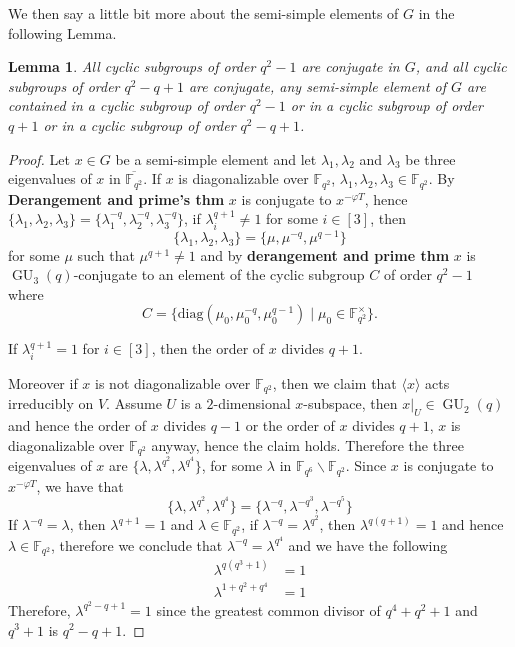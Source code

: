 \documentclass[12pt,reqno]{amsart}
\newcommand{\GU}{\operatorname{GU}}
\newcommand{\FF}{\mathbb{F}}
\newcommand{\lr}{\langle}
\newcommand{\rr}{\rangle}
\theoremstyle{plain}
\newtheorem{lemma}[proposition]{Lemma}
\theoremstyle{definition}
\begin{document}
We then say a little bit more about the semi-simple elements of $G$ in the following Lemma.
\begin{lemma}\label{semisimple}
	All cyclic subgroups of order $q^2-1$ are conjugate in $G$, and all cyclic subgroups of order $q^2-q+1$ are conjugate, any semi-simple element of $G$ are contained in a cyclic subgroup of order $q^2-1$ or in a cyclic subgroup of order $q+1$ or in a cyclic subgroup of order $q^2-q+1$.
\end{lemma}
\begin{proof}
  Let $x\in G$ be a semi-simple element and let $\lambda_1,\lambda_2$ and $\lambda_3$ be three eigenvalues of $x$ in $\overline{\FF_{q^2}}$. 
  If $x$ is diagonalizable over $\FF_{q^2}$, $\lambda_1,\lambda_2,\lambda_3\in \FF_{q^2}$.
  By \textbf{Derangement and prime's thm} $x$ is conjugate to $x^{-\varphi T}$, hence $\{\lambda_1,\lambda_2,\lambda_3\}=\{\lambda_1^{-q},\lambda_2^{-q},\lambda_3^{-q}\}$, if $\lambda_i^{q+1}\neq 1$ for some $i\in[3]$,  then $$\{\lambda_1,\lambda_2,\lambda_3\}=\{\mu, \mu^{-q}, \mu^{q-1} \}$$ for some $\mu $ such that $\mu^{q+1}\neq 1$ and by \textbf{derangement and prime thm} $x$ is $\GU_3(q)$-conjugate to an element of the cyclic subgroup $C$ of order $q^2-1$ where $$C=\{\mathrm{diag}(\mu_0,\mu_0^{-q},\mu_0^{q-1})\mid \mu_0\in \FF_{q^2}^{\times} \}.$$ 
  
  
  If $\lambda_i^{q+1}=1$ for $i \in [3]$, then the order of $x$ divides $q+1$.
  
  Moreover if $x$ is not diagonalizable over $\FF_{q^2}$, then we claim that $\lr x \rr$ acts irreducibly on $V$.
  Assume $U$ is a $2$-dimensional $x$-subspace, then $x|_U\in \GU_2(q)$ and hence the order of $x$ divides $q-1$ or the order of $x$ divides $q+1$, $x$ is diagonalizable over $\FF_{q^2}$ anyway, hence the claim holds.
   Therefore the three eigenvalues of $x$ are $\{\lambda, \lambda^{q^2},\lambda^{q^4} \}$,
   for some $\lambda$ in $\FF_{q^6}\backslash\FF_{q^2}$. Since $x$ is conjugate to $x^{-\varphi T}$,  we have that 
   \begin{equation*}
   	\{\lambda, \lambda^{q^2},\lambda^{q^4} \}=\{\lambda^{-q}, \lambda^{-q^3}, \lambda^{-q^5}  \}
   \end{equation*}
   If $\lambda^{-q}=\lambda$, then $\lambda^{q+1}=1$ and $\lambda \in \FF_{q^2}$, if $\lambda^{-q}=\lambda^{q^2}$, then $\lambda^{q(q+1)}=1$ and hence  $\lambda \in \FF_{q^2}$, therefore we conclude that $\lambda^{-q}=\lambda^{q^4}$ and we have the following 
   \begin{equation*}
   	\begin{aligned}
   	\lambda^{q(q^3+1)}&=1\\
   	\lambda^{1+q^2+q^4}&=1
   \end{aligned}
   \end{equation*}
Therefore, $\lambda^{q^2-q+1}=1$ since the greatest common divisor of $q^4+q^2+1$ and $q^3+1$ is $q^2-q+1$.



\end{proof}
\end{document}
